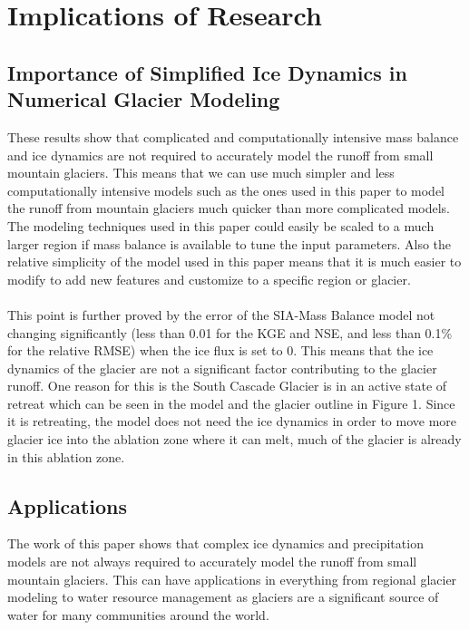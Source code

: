 \documentclass{article}
\begin{document}
\section{Implications of Research}
\subsection{Importance of Simplified Ice Dynamics in Numerical Glacier Modeling}
These results show that complicated and computationally intensive mass balance and ice dynamics are not required to accurately model the 
runoff from small mountain glaciers. This means that we can use much simpler and less computationally intensive models such as the ones used 
in this paper to model the runoff from mountain glaciers much quicker than more complicated models. The modeling techniques used in this paper could 
easily be scaled to a much larger region if mass balance is available to tune the input parameters. Also the relative simplicity of the model used in 
this paper means that it is much easier to modify to add new features and customize to a specific region or glacier.
\paragraph{}
This point is further proved by the error of the SIA-Mass Balance model not changing significantly (less than 0.01 for the KGE and NSE, and less than 
0.1\% for the relative RMSE) when 
the ice flux is set to 0. This means that the ice dynamics of the glacier are not a significant factor contributing to the glacier runoff. One reason 
for this is the South Cascade Glacier is in an active state of retreat which can be seen in the model and the 
glacier outline in Figure 1. Since it is retreating, the model does not need the ice dynamics in order to move more glacier ice into the ablation zone 
where it can melt, much of the glacier is already in this ablation zone.
\subsection{Applications}
The work of this paper shows that complex ice dynamics and precipitation models are not always required to accurately model the runoff from small mountain glaciers. This 
can have applications in everything from regional glacier modeling to water resource management as glaciers are a significant source of water 
for many communities around the world. 
\end{document}
